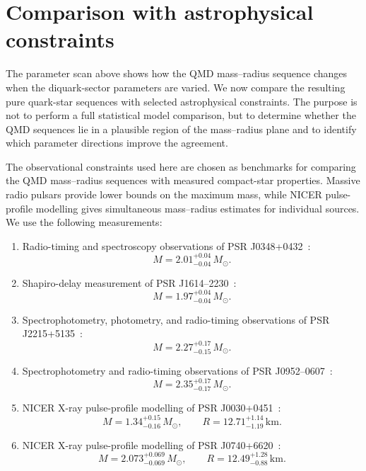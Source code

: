 \section{Comparison with astrophysical constraints}
\label{sec:qmd_observational_comparison}

The parameter scan above shows how the QMD mass--radius sequence changes
when the diquark-sector parameters are varied. We now compare the
resulting pure quark-star sequences with selected astrophysical
constraints. The purpose is not to perform a full statistical model
comparison, but to determine whether the QMD sequences lie in a plausible
region of the mass--radius plane and to identify which parameter
directions improve the agreement.

The observational constraints used here are chosen as benchmarks for comparing
the QMD mass--radius sequences with measured compact-star properties. Massive
radio pulsars provide lower bounds on the maximum mass, while NICER
pulse-profile modelling gives simultaneous mass--radius estimates for
individual sources. We use the following measurements:
\begin{enumerate}
    \item Radio-timing and spectroscopy observations of
    PSR J0348+0432~\cite{Antoniadis_2013_J0348}:
    \[
        M = 2.01^{+0.04}_{-0.04}\,M_\odot .
    \]

    \item Shapiro-delay measurement of
    PSR J1614--2230~\cite{Demorest_2010_J1614}:
    \[
        M = 1.97^{+0.04}_{-0.04}\,M_\odot .
    \]

    \item Spectrophotometry, photometry, and radio-timing observations of
    PSR J2215+5135~\cite{linares2018}:
    \[
        M = 2.27^{+0.17}_{-0.15}\,M_\odot .
    \]

    \item Spectrophotometry and radio-timing observations of
    PSR J0952--0607~\cite{romani2022}:
    \[
        M = 2.35^{+0.17}_{-0.17}\,M_\odot .
    \]

    \item NICER X-ray pulse-profile modelling of
    PSR J0030+0451~\cite{Riley_2019_J0030}:
    \[
        M = 1.34^{+0.15}_{-0.16}\,M_\odot,
        \qquad
        R = 12.71^{+1.14}_{-1.19}\,\mathrm{km}.
    \]

    \item NICER X-ray pulse-profile modelling of
    PSR J0740+6620~\cite{Salmi_2024_J0740}:
    \[
        M = 2.073^{+0.069}_{-0.069}\,M_\odot,
        \qquad
        R = 12.49^{+1.28}_{-0.88}\,\mathrm{km}.
    \]
\end{enumerate}

